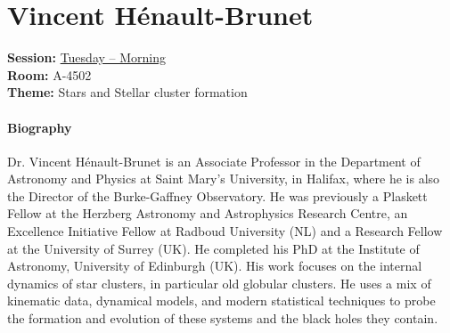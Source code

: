 \section{Vincent Hénault-Brunet}
\textbf{Session:} \hyperlink{schedule-tuesday-morning-a-4502}{Tuesday -- Morning}\\
\textbf{Room:} A-4502\\
\textbf{Theme:} Stars and Stellar cluster formation\\

\paragraph{Biography}
{\sffamily
Dr. Vincent Hénault-Brunet is an Associate Professor in the Department of Astronomy and Physics at Saint Mary's University, in Halifax, where he is also the Director of the Burke-Gaffney Observatory. He was previously a Plaskett Fellow at the Herzberg Astronomy and Astrophysics Research Centre, an Excellence Initiative Fellow at Radboud University (NL) and a Research Fellow at the University of Surrey (UK). He completed his PhD at the Institute of Astronomy, University of Edinburgh (UK). His work focuses on the internal dynamics of star clusters, in particular old globular clusters. He uses a mix of kinematic data, dynamical models, and modern statistical techniques to probe the formation and evolution of these systems and the black holes they contain.
}

